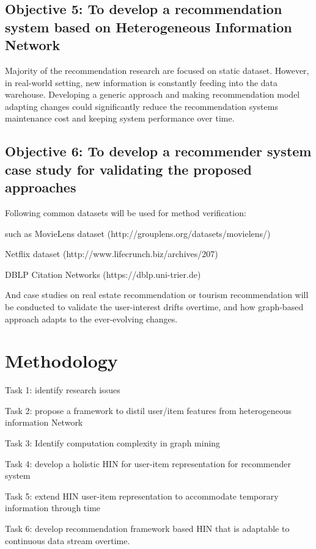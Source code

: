 \documentclass[12pt,a4 paper,title page]{article}
\begin{document}
\subsection{Objective 5: To develop a recommendation system based on Heterogeneous Information Network} 

Majority of the recommendation research are focused on static dataset. However, in real-world setting, new information is constantly feeding into the data warehouse. Developing a generic approach and making recommendation model adapting changes could significantly reduce the recommendation systems maintenance cost and keeping system performance over time. 

\subsection{Objective 6: To develop a recommender system case study for validating the proposed approaches}

Following common datasets will be used for method verification: 

such as MovieLens dataset (http://grouplens.org/datasets/movielens/) 

Netflix dataset (http://www.lifecrunch.biz/archives/207) 

DBLP Citation Networks (https://dblp.uni-trier.de)  

And case studies on real estate recommendation or tourism recommendation will be conducted to validate the user-interest drifts overtime, and how graph-based approach adapts to the ever-evolving changes. 

\section{Methodology}

Task 1: identify research issues 

Task 2: propose a framework to distil user/item features from heterogeneous information Network 

Task 3: Identify computation complexity in graph mining 

Task 4: develop a holistic HIN for user-item representation for recommender system 

Task 5: extend HIN user-item representation to accommodate temporary information through time 

Task 6: develop recommendation framework based HIN that is adaptable to continuous data stream overtime. 
\end{document}
